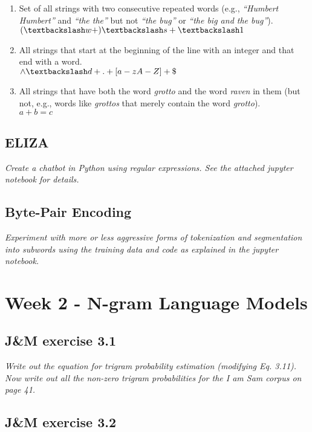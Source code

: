 \documentclass[a4paper, 11pt]{article}
\begin{document}
\begin{enumerate}
	\item Set of all strings with two consecutive repeated words (e.g., \textit{“Humbert Humbert”} and \textit{“the the”} but not \textit{“the bug”} or \textit{“the big and the bug”}). \\ $ (\textbackslash w+) \textbackslash s+ \textbackslash1 $
	
	\item All strings that start at the beginning of the line with an integer and that end with a word. \\ $ \wedge \textbackslash d+.+[a-zA-Z]+\$ $
	
	\item All strings that have both the word \textit{grotto} and the word \textit{raven} in them (but not, e.g., words like \textit{grottos} that merely contain the word \textit{grotto}). \\ $a + b = c$
\end{enumerate}

\subsection{ELIZA}

\textit{Create a chatbot in Python using regular expressions. See the attached jupyter notebook for details.}

\subsection{Byte-Pair Encoding}

\textit{Experiment with more or less aggressive forms of tokenization and segmentation into subwords using the training data and code as explained in the jupyter notebook.}

\section{Week 2 - N-gram Language Models}

\subsection{J\&M exercise 3.1}

\textit{Write out the equation for trigram probability estimation (modifying Eq. 3.11). Now write out all the non-zero trigram probabilities for the I am Sam corpus on page 41.}

\subsection{J\&M exercise 3.2}
\end{document}
